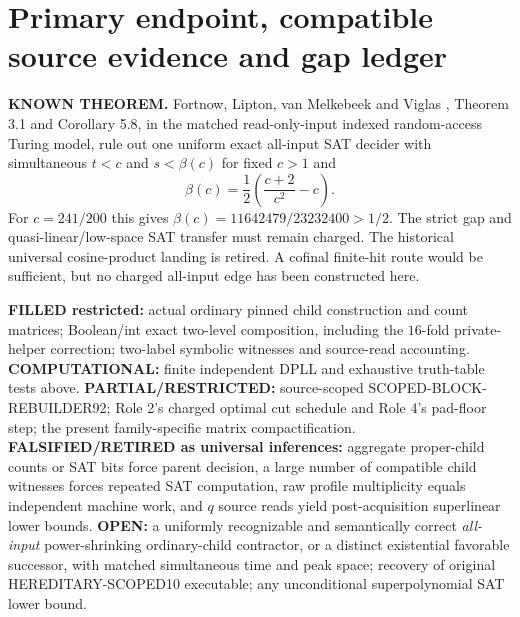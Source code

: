 \documentclass[11pt]{article}
\begin{document}
\section{Primary endpoint, compatible source evidence and gap ledger}
\textbf{KNOWN THEOREM.} Fortnow, Lipton, van Melkebeek and Viglas
\cite{flmv}, Theorem 3.1 and Corollary 5.8, in the matched
read-only-input indexed random-access Turing model, rule out one
uniform exact all-input SAT decider with simultaneous
$t<c$ and $s<\beta(c)$ for fixed $c>1$ and
\[
 \beta(c)=\frac12\left(\frac{c+2}{c^2}-c\right).
\]
For $c=241/200$ this gives
$\beta(c)=11642479/23232400>1/2$. The strict gap and
quasi-linear/low-space SAT transfer must remain charged.
The historical universal cosine-product landing is retired.
A cofinal finite-hit route would be sufficient, but no charged
all-input edge has been constructed here.

\textbf{FILLED restricted:} actual ordinary pinned child
construction and count matrices; Boolean/int exact two-level
composition, including the $16$-fold private-helper correction;
two-label symbolic witnesses and source-read accounting.
\textbf{COMPUTATIONAL:} finite independent DPLL and exhaustive
truth-table tests above.
\textbf{PARTIAL/RESTRICTED:} source-scoped
SCOPED-BLOCK-REBUILDER92; Role 2's charged optimal cut schedule
and Role 4's pad-floor step; the present family-specific
matrix compactification.
\textbf{FALSIFIED/RETIRED as universal inferences:} aggregate
proper-child counts or SAT bits force parent decision,
a large number of compatible child witnesses forces
repeated SAT computation, raw profile multiplicity equals
independent machine work, and $q$ source reads yield
post-acquisition superlinear lower bounds.
\textbf{OPEN:} a uniformly recognizable and semantically
correct \emph{all-input} power-shrinking ordinary-child
contractor, or a distinct existential favorable successor,
with matched simultaneous time and peak space;
recovery of original HEREDITARY-SCOPED10 executable;
any unconditional superpolynomial SAT lower bound.
\end{document}

